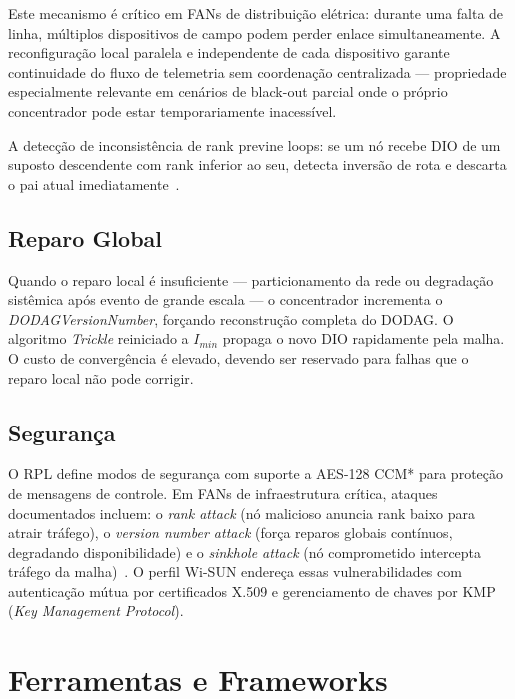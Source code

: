 \documentclass[conference]{IEEEtran}
\begin{document}
Este mecanismo é crítico em FANs de distribuição elétrica: durante uma falta
de linha, múltiplos dispositivos de campo podem perder enlace simultaneamente.
A reconfiguração local paralela e independente de cada dispositivo garante
continuidade do fluxo de telemetria sem coordenação centralizada --- propriedade
especialmente relevante em cenários de black-out parcial onde o próprio
concentrador pode estar temporariamente inacessível.

A detecção de inconsistência de rank previne loops: se um nó recebe DIO de um
suposto descendente com rank inferior ao seu, detecta inversão de rota e
descarta o pai atual imediatamente~\cite{winter2012rpl}.

\subsection{Reparo Global}

Quando o reparo local é insuficiente --- particionamento da rede ou degradação
sistêmica após evento de grande escala --- o concentrador incrementa o
\textit{DODAGVersionNumber}, forçando reconstrução completa do DODAG. O
algoritmo \textit{Trickle} reiniciado a $I_{min}$ propaga o novo DIO rapidamente pela
malha. O custo de convergência é elevado, devendo ser reservado para falhas que
o reparo local não pode corrigir.

\subsection{Segurança}

O RPL define modos de segurança com suporte a AES-128 CCM* para proteção de
mensagens de controle. Em FANs de infraestrutura crítica, ataques documentados
incluem: o \textit{rank attack} (nó malicioso anuncia rank baixo para atrair
tráfego), o \textit{version number attack} (força reparos globais contínuos,
degradando disponibilidade) e o \textit{sinkhole attack} (nó comprometido
intercepta tráfego da malha)~\cite{korte2012rplattacks}. O perfil Wi-SUN
endereça essas vulnerabilidades com autenticação mútua por certificados X.509 e
gerenciamento de chaves por KMP (\textit{Key Management Protocol}).

\section{Ferramentas e Frameworks}
\label{sec:tools}
\end{document}
